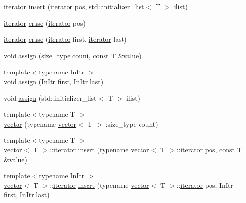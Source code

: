 \begin{DoxyCompactItemize}
\item 
\mbox{\hyperlink{classsc_1_1vector_1_1iterator}{iterator}} \mbox{\hyperlink{classsc_1_1vector_a012eb735dde72dfb787dca4acea6c642}{insert}} (\mbox{\hyperlink{classsc_1_1vector_1_1iterator}{iterator}} pos, std\+::initializer\+\_\+list$<$ T $>$ ilist)
\item 
\mbox{\hyperlink{classsc_1_1vector_1_1iterator}{iterator}} \mbox{\hyperlink{classsc_1_1vector_a9dcc8ea80726caae68ac935ca677abfe}{erase}} (\mbox{\hyperlink{classsc_1_1vector_1_1iterator}{iterator}} pos)
\item 
\mbox{\hyperlink{classsc_1_1vector_1_1iterator}{iterator}} \mbox{\hyperlink{classsc_1_1vector_ad6a6907a57004d43d2c37767ce9da5e5}{erase}} (\mbox{\hyperlink{classsc_1_1vector_1_1iterator}{iterator}} first, \mbox{\hyperlink{classsc_1_1vector_1_1iterator}{iterator}} last)
\item 
void \mbox{\hyperlink{classsc_1_1vector_aaa1279dfc147a016a70a65faa7d89c23}{assign}} (size\+\_\+type count, const T \&value)
\item 
{\footnotesize template$<$typename In\+Itr $>$ }\\void \mbox{\hyperlink{classsc_1_1vector_ab3e7f37e35c8a5206d069676540a2573}{assign}} (In\+Itr first, In\+Itr last)
\item 
void \mbox{\hyperlink{classsc_1_1vector_a124042d2f64be269c9b5d03f90508d6e}{assign}} (std\+::initializer\+\_\+list$<$ T $>$ ilist)
\item 
{\footnotesize template$<$typename T $>$ }\\\mbox{\hyperlink{classsc_1_1vector_a09edcd127164af330873721038aa4ccc}{vector}} (typename \mbox{\hyperlink{classsc_1_1vector}{vector}}$<$ T $>$\+::size\+\_\+type count)
\item 
{\footnotesize template$<$typename T $>$ }\\\mbox{\hyperlink{classsc_1_1vector}{vector}}$<$ T $>$\+::\mbox{\hyperlink{classsc_1_1vector_1_1iterator}{iterator}} \mbox{\hyperlink{classsc_1_1vector_a1aaf0a1fcdac2a58a96a2a00105b2e1f}{insert}} (typename \mbox{\hyperlink{classsc_1_1vector}{vector}}$<$ T $>$\+::\mbox{\hyperlink{classsc_1_1vector_1_1iterator}{iterator}} pos, const T \&value)
\item 
{\footnotesize template$<$typename In\+Itr $>$ }\\\mbox{\hyperlink{classsc_1_1vector}{vector}}$<$ T $>$\+::\mbox{\hyperlink{classsc_1_1vector_1_1iterator}{iterator}} \mbox{\hyperlink{classsc_1_1vector_a774a81ea7131584862592c29a8137e28}{insert}} (typename \mbox{\hyperlink{classsc_1_1vector}{vector}}$<$ T $>$\+::\mbox{\hyperlink{classsc_1_1vector_1_1iterator}{iterator}} pos, In\+Itr first, In\+Itr last)

\end{DoxyCompactItemize}
